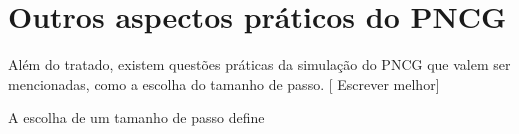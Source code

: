 \section{Outros aspectos práticos do PNCG}

Além do tratado, existem questões práticas da simulação do PNCG que valem ser mencionadas, como a escolha do tamanho de passo. [ Escrever melhor]

A escolha de um tamanho de passo define